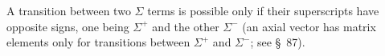 A transition between two $\Sigma$ terms is possible only if their superscripts have opposite signs, one being $\Sigma^+$ and the other $\Sigma^-$ (an axial vector has matrix elements only for transitions between $\Sigma^+$ and $\Sigma^-$; see \S~87).
